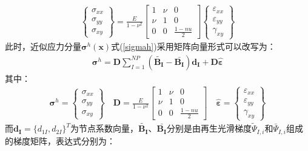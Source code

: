 \begin{equation}
\begin{split}
    \left\{\begin{matrix}
    \sigma_{xx}\\\sigma_{yy}\\\sigma_{xy}
    \end{matrix}\right\}=\frac{E}{1-\nu^2}
    \left[\begin{matrix}
    1&\nu&0\\\nu&1&0\\0&0&\frac{1-nu}{2}
    \end{matrix}\right]
    \left\{\begin{matrix}
    \varepsilon_{xx}\\\varepsilon_{yy}\\\gamma_{xy}
 \end{matrix}\right\}
\end{split}
\end{equation}
此时，近似应力分量$\pmb{\sigma}^h(\pmb{x})$式(\ref{sigmah})采用矩阵向量形式可以改写为：
\begin{equation}
\begin{split}
\pmb{\sigma}^h=\pmb{D}\sum_{I=1}^{N\!P}(\tilde{\pmb{B_I}}-\bar{\pmb{B_I}})\pmb{d_I}+\pmb{D}\hat{\pmb{\varepsilon}}
\end{split}
\end{equation}
其中：
\begin{equation}
\begin{split}
    \pmb{\sigma}^h=\left\{\begin{matrix}
        \sigma_{xx}\\\sigma_{yy}\\\sigma_{xy}
        \end{matrix}\right\}\quad
    \pmb{D}=\frac{E}{1-\nu^2}
    \left[\begin{matrix}
    1&\nu&0\\\nu&1&0\\0&0&\frac{1-nu}{2}
    \end{matrix}\right]\quad
    \hat{\pmb{\varepsilon}}=\left\{\begin{matrix}
        \varepsilon_{xx}\\\varepsilon_{yy}\\\gamma_{xy}
     \end{matrix}\right\}
\end{split}
\end{equation}
而$\pmb{d_I}=\{d_{1I},d_{2I}\}^T$为节点系数向量，$\tilde{\pmb{B_I}}\text{、}\bar{\pmb{B_I}}$分别是由再生光滑梯度$\tilde{\Psi}_{I,i}$和$\bar{\Psi}_{I,i}$组成的梯度矩阵，表达式分别为：
